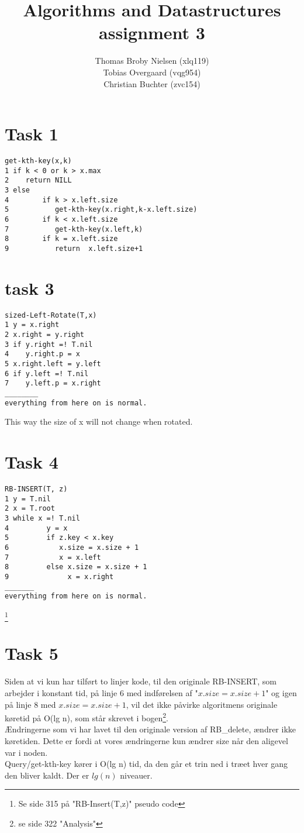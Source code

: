 \documentclass[12pt]{article}
\title{Algorithms and Datastructures assignment 3}
\author{Thomas Broby Nielsen (xlq119)\\ Tobias Overgaard (vqg954)\\ Christian Buchter (zvc154)}
\begin{document}
\maketitle

\tableofcontents

\pagebreak
\section{Task 1}
\begin{verbatim}
get-kth-key(x,k)
1 if k < 0 or k > x.max
2    return NILL
3 else
4        if k > x.left.size
5           get-kth-key(x.right,k-x.left.size)
6        if k < x.left.size
7           get-kth-key(x.left,k)
8        if k = x.left.size
9           return  x.left.size+1
\end{verbatim}

\newpage
\section{task 3}
\begin{verbatim}
sized-Left-Rotate(T,x)
1 y = x.right
2 x.right = y.right
3 if y.right =! T.nil
4    y.right.p = x
5 x.right.left = y.left
6 if y.left =! T.nil
7    y.left.p = x.right
________
everything from here on is normal.
\end{verbatim}
This way the size of x will not change when rotated.
\newpage

\section{Task 4}
\begin{verbatim}
RB-INSERT(T, z)
1 y = T.nil
2 x = T.root
3 while x =! T.nil
4         y = x
5         if z.key < x.key
6            x.size = x.size + 1
7            x = x.left
8         else x.size = x.size + 1
9              x = x.right
_______
everything from here on is normal.
\end{verbatim}
\footnote{Se side 315 på "RB-Insert(T,z)" pseudo code}
\newpage

\section{Task 5}
Siden at vi kun har tilført to linjer kode, til den originale RB-INSERT, som arbejder i konstant tid, på linje 6 med indførelsen af "$x.size = x.size + 1$" og igen på linje 8 med $x.size = x.size + 1$, vil det ikke påvirke algoritmens originale køretid på O(lg n), som står skrevet i bogen\footnote{se side 322 "Analysis"}.
\\
Ændringerne som vi har lavet til den originale version af RB\_delete, ændrer ikke køretiden. Dette er fordi at vores ændringerne kun ændrer size når den aligevel var i noden.\\
Query/get-kth-key kører i O(lg n) tid, da den går et trin ned i træet hver gang den bliver kaldt. Der er $lg(n)$ niveauer.
\end{document}
